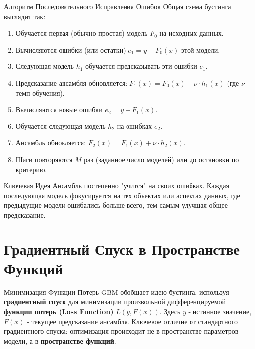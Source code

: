 \begin{textbox}{Алгоритм Последовательного Исправления Ошибок}
    Общая схема бустинга выглядит так:
    \begin{enumerate}[nosep]
        \item Обучается первая (обычно простая) модель $F_0$ на исходных данных.
        \item Вычисляются ошибки (или остатки) $e_1 = y - F_0(x)$ этой модели.
        \item Следующая модель $h_1$ обучается предсказывать эти ошибки $e_1$.
        \item Предсказание ансамбля обновляется: $F_1(x) = F_0(x) + \nu \cdot h_1(x)$ (где $\nu$ - темп обучения).
        \item Вычисляются новые ошибки $e_2 = y - F_1(x)$.
        \item Обучается следующая модель $h_2$ на ошибках $e_2$.
        \item Ансамбль обновляется: $F_2(x) = F_1(x) + \nu \cdot h_2(x)$.
        \item Шаги повторяются $M$ раз (заданное число моделей) или до остановки по критерию.
    \end{enumerate}
\end{textbox}

\begin{myblock}{Ключевая Идея}
    Ансамбль постепенно "учится" на своих ошибках. Каждая последующая модель фокусируется на тех объектах или аспектах данных, где предыдущие модели ошибались больше всего, тем самым улучшая общее предсказание.
\end{myblock}

\section{Градиентный Спуск в Пространстве Функций}

\begin{myblock}{Минимизация Функции Потерь}
    GBM обобщает идею бустинга, используя \textbf{градиентный спуск} для минимизации произвольной дифференцируемой \textbf{функции потерь (Loss Function)} $L(y, F(x))$. Здесь $y$ - истинное значение, $F(x)$ - текущее предсказание ансамбля.
    \newline
    Ключевое отличие от стандартного градиентного спуска: оптимизация происходит не в пространстве параметров модели, а в \textbf{пространстве функций}.
\end{myblock}

